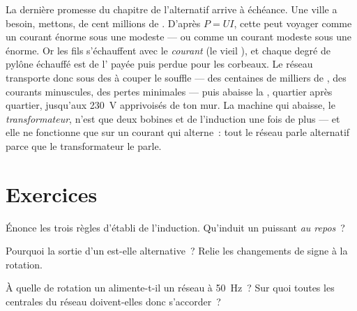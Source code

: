 \begin{remark}\label{rem:g9:alternator:transport}
La dernière promesse du chapitre de l'alternatif arrive à échéance.
Une ville a besoin, mettons, de cent millions de . D'après
$P = U I$, cette  peut voyager comme un courant énorme sous
une  modeste --- ou comme un courant modeste sous une 
énorme. Or les fils s'échauffent avec le \emph{courant} (le vieil
), et chaque degré de pylône échauffé est de l'
payée puis perdue pour les corbeaux. Le réseau transporte donc sous
des  à couper le souffle --- des centaines de milliers de
, des courants minuscules, des pertes minimales --- puis abaisse
la , quartier après quartier, jusqu'aux \qty{230}{V}
apprivoisés de ton mur. La machine qui abaisse, le
\emph{transformateur}, n'est que deux bobines et de l'induction une
fois de plus --- et elle ne fonctionne que sur un courant qui
alterne~: tout le réseau parle alternatif parce que le transformateur
le parle.
\end{remark}

\section{Exercices}

\begin{exercise}[$\star$]\label{exo:g9:alternator:1}
Énonce les trois règles d'établi de l'induction. Qu'induit un 
puissant \emph{au repos}~?
\end{exercise}

\begin{exercise}[$\star$]\label{exo:g9:alternator:2}
Pourquoi la sortie d'un  est-elle alternative~? Relie les
changements de signe à la rotation.
\end{exercise}

\begin{exercise}[$\star$]\label{exo:g9:alternator:3}
À quelle  de rotation un  alimente-t-il un réseau à
\qty{50}{Hz}~? Sur quoi toutes les centrales du réseau doivent-elles
donc s'accorder~?
\end{exercise}

